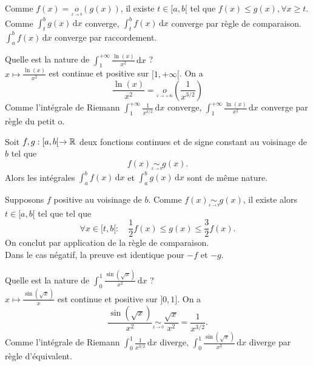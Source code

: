 \documentclass{book}
\begin{document}
\begin{Demonstration}
 Comme $ f(x)=\underset{ \overset { x \rightarrow b } {} } {o}(g(x))$, il existe $t\in[a,b[$ tel que $f(x)\leq g(x), \forall x\geq t.$ Comme $\int_t^b g(x)\,\mathrm dx$ converge, $\int_t^b f(x)\,\mathrm dx$ converge par règle de comparaison. $\int_a^b f(x)\,\mathrm dx$ converge par raccordement.
\end{Demonstration}
\begin{Exemple}
Quelle est la nature de $\int_1^{+\infty}\frac{\ln(x)}{x^2}  \,\mathrm dx$ ?\\
$x\mapsto \frac{\ln(x)}{x^2}$ est continue et positive  sur $[1,+\infty[$.
On a  
$$\frac{\ln(x)}{x^2} =\underset{ \overset { x \rightarrow +\infty} {} } {o}\left(\frac{1}{x^{3/2}}\right) $$
Comme l'intégrale de Riemann $\int_1^{+\infty}\frac{1}{x^{3/2}}\,\mathrm dx$ converge, $\int_1^{+\infty}\frac{\ln(x)}{x^2} \,\mathrm dx$ converge par règle du petit o.
\end{Exemple}
\begin{Theoreme}
Soit $f,g:[a,b[\to\mathbb{R}$ deux fonctions continues et de signe constant au voisinage de $b$ tel que
$$ f(x)\underset{ \overset { x \rightarrow b } {} } {\sim}g(x).$$ 
Alors les intégrales $\int_a^b f(x)\,\mathrm dx$ et $\int_a^b g(x)\,\mathrm dx$ sont de même nature.
\end{Theoreme}
\begin{Demonstration}
Supposons $f$ positive au voisinage de $b$. Comme $ f(x)\underset{ \overset { x \rightarrow b } {} } {\sim}g(x)$, il existe alors $t \in [a,b [$ 
tel que tel que $$\forall x\in [t,b[: \quad  \frac{1}{2}f(x)\leq g(x)\leq \frac{3}{2}f(x).$$
On conclut par application de la règle de comparaison.\\
Dans le cas négatif, la preuve est identique pour $-f$ et $-g$.
\end{Demonstration}

\begin{Exemple}
Quelle est la nature de $\int_0^{1}\frac{\sin(\sqrt{x})}{x^2}  \,\mathrm dx$ ?\\
$x\mapsto \frac{\sin(\sqrt{x})}{x}$ est continue et positive  sur $]0,1]$. On a \\
$$ \frac{\sin(\sqrt{x})}{x^2} \underset{ \overset { x \rightarrow 0 } {} }{\sim}\frac{\sqrt{x}}{x^2}=\frac{1}{x^{3/2}}.$$
Comme l'intégrale de Riemann $\int_0^1 \frac{1}{x^{3/2}}\,\mathrm dx$ diverge, $\int_0^{1}\frac{\sin(\sqrt{x})}{x^2}  \,\mathrm dx$ diverge par règle d'équivalent.
\end{Exemple}
\end{document}
